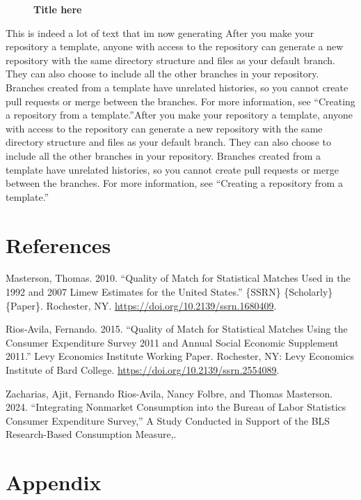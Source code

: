 \documentclass[
  12pt,
]{article}
\newlength{\cslhangindent}
\newenvironment{CSLReferences}[2] %
 {\begin{list}{}{%
  \setlength{\itemindent}{0pt}
  \setlength{\leftmargin}{0pt}
  \setlength{\parsep}{1em}
  \ifodd #1
   \setlength{\leftmargin}{\cslhangindent}
   \setlength{\itemindent}{-1\cslhangindent}
  \fi
  \setlength{\itemsep}{#2\baselineskip}}}
 {\end{list}}
\begin{document}
\lipsum[1-2]

\begin{figure}

\caption{\label{fig-one}\textbf{Title here}}


\end{figure}%

This is indeed a lot of text that im now generating After you make your
repository a template, anyone with access to the repository can generate
a new repository with the same directory structure and files as your
default branch. They can also choose to include all the other branches
in your repository. Branches created from a template have unrelated
histories, so you cannot create pull requests or merge between the
branches. For more information, see ``Creating a repository from a
template.''After you make your repository a template, anyone with access
to the repository can generate a new repository with the same directory
structure and files as your default branch. They can also choose to
include all the other branches in your repository. Branches created from
a template have unrelated histories, so you cannot create pull requests
or merge between the branches. For more information, see ``Creating a
repository from a template.''

\section{References}\label{references}

\singlespacing

\label{refs}
\begin{CSLReferences}{1}{0}
Masterson, Thomas. 2010. {``Quality of {Match} for {Statistical}
{Matches} {Used} in the 1992 and 2007 {Limew} {Estimates} for the
{United} {States}.''} \{SSRN\} \{Scholarly\} \{Paper\}. Rochester, NY.
\url{https://doi.org/10.2139/ssrn.1680409}.

Rios‐Avila, Fernando. 2015. {``Quality of {Match} for {Statistical}
{Matches} {Using} the {Consumer} {Expenditure} {Survey} 2011 and
{Annual} {Social} {Economic} {Supplement} 2011.''} Levy Economics
Institute Working Paper. Rochester, NY: Levy Economics Institute of Bard
College. \url{https://doi.org/10.2139/ssrn.2554089}.

Zacharias, Ajit, Fernando Rios-Avila, Nancy Folbre, and Thomas
Masterson. 2024. {``Integrating {Nonmarket} {Consumption} into the
{Bureau} of {Labor} {Statistics} {Consumer} {Expenditure} {Survey},''} A
{Study} {Conducted} in {Support} of the {BLS} {Research}-{Based}
{Consumption} {Measure},.

\end{CSLReferences}

\onehalfspacing

\section{Appendix}\label{appendix}

\lipsum[1-2]
\end{document}
